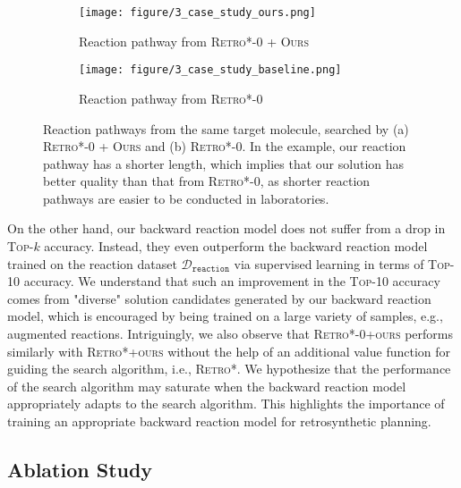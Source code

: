 \begin{figure*}[t!]
\vspace{0.1in}
\centering
\begin{subfigure}{0.44730671739\textwidth}
\centering
\texttt{[image: figure/3\_case\_study\_ours.png]}
\caption{Reaction pathway from \textsc{Retro*-0 + Ours}}
\end{subfigure}
\begin{subfigure}{0.50269328261\textwidth}
\centering
\texttt{[image: figure/3\_case\_study\_baseline.png]}
\caption{Reaction pathway from \textsc{Retro*-0}}
\end{subfigure}
\caption{Reaction pathways from the same target molecule, searched by (a) \textsc{Retro*-0 + Ours} and (b) \textsc{Retro*-0}. In the example, our reaction pathway has a shorter length, which implies that our solution has better quality than that from \textsc{Retro*-0}, as shorter reaction pathways are easier to be conducted in laboratories.}
\label{fig:case_study}
\end{figure*} On the other hand, our backward reaction model does not suffer from a drop in \textsc{Top-$k$} accuracy. Instead, they even outperform the backward reaction model trained on the reaction dataset $\mathcal{D}_{\mathtt{reaction}}$ via supervised learning in terms of \textsc{Top-10} accuracy. 
We understand that such an improvement in the \textsc{Top-10} accuracy comes from "diverse" solution candidates generated by our backward reaction model, which is encouraged by being trained on a large variety of samples, e.g., augmented reactions.
Intriguingly, we also observe that \textsc{Retro*-0+ours} performs similarly with \textsc{Retro*+ours} without the help of an additional value function for guiding the search algorithm, i.e., \textsc{Retro*}. We hypothesize that the performance of the search algorithm may saturate when the backward reaction model appropriately adapts to the search algorithm. This highlights the importance of training an appropriate backward reaction model for retrosynthetic planning. 



















\subsection{Ablation Study}

